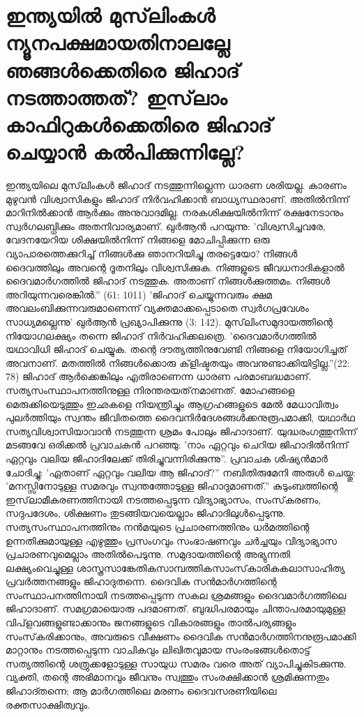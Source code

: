  \section{ ഇന്ത്യയില്‍ മുസ്‌ലിംകള്‍ ന്യൂനപക്ഷമായതിനാലല്ലേ ഞങ്ങള്‍ക്കെതിരെ ജിഹാദ് നടത്താത്തത്? ഇസ്‌ലാം കാഫിറുകള്‍ക്കെതിരെ ജിഹാദ് ചെയ്യാന്‍ കല്‍പിക്കുന്നില്ലേ?}
 ഇന്ത്യയിലെ മുസ്‌ലിംകള്‍ ജിഹാദ് നടത്തുന്നില്ലെന്ന ധാരണ ശരിയല്ല. കാരണം മുഴുവന്‍ വിശ്വാസികളും ജിഹാദ് നിര്‍വഹിക്കാന്‍ ബാധ്യസ്ഥരാണ്. അതില്‍നിന്ന് മാറിനില്‍ക്കാന്‍ ആര്‍ക്കും അനുവാദമില്ല. നരകശിക്ഷയില്‍നിന്ന് രക്ഷനേടാനും സ്വര്‍ഗലബ്ധിക്കും അതനിവാര്യമാണ്. ഖുര്‍ആന്‍ പറയുന്നു: 'വിശ്വസിച്ചവരേ, വേദനയേറിയ ശിക്ഷയില്‍നിന്ന് നിങ്ങളെ മോചിപ്പിക്കുന്ന ഒരു വ്യാപാരത്തെക്കുറിച്ച് നിങ്ങള്‍ക്കു ഞാനറിയിച്ചു തരട്ടെയോ? നിങ്ങള്‍ ദൈവത്തിലും അവന്റെ ദൂതനിലും വിശ്വസിക്കുക. നിങ്ങളുടെ ജീവധനാദികളാല്‍ ദൈവമാര്‍ഗത്തില്‍ ജിഹാദ് നടത്തുക. അതാണ് നിങ്ങള്‍ക്കുത്തമം. നിങ്ങള്‍ അറിയുന്നവരെങ്കില്‍.'' (61: 1011)
'ജിഹാദ് ചെയ്യുന്നവരും ക്ഷമ അവലംബിക്കുന്നവരുമാണെന്ന് വ്യക്തമാക്കപ്പെടാതെ സ്വര്‍ഗപ്രവേശം സാധ്യമല്ലെന്നു' ഖുര്‍ആന്‍ പ്രഖ്യാപിക്കുന്നു (3: 142). മുസ്‌ലിംസമുദായത്തിന്റെ നിയോഗലക്ഷ്യം തന്നെ ജിഹാദ് നിര്‍വഹിക്കലത്രെ. 'ദൈവമാര്‍ഗത്തില്‍ യഥാവിധി ജിഹാദ് ചെയ്യുക. തന്റെ ദൗത്യത്തിനുവേണ്ടി നിങ്ങളെ നിയോഗിച്ചത് അവനാണ്. മതത്തില്‍ നിങ്ങള്‍ക്കൊരു ക്‌ളിഷ്ടതയും അവനുണ്ടാക്കിയിട്ടില്ല.''(22: 78)
ജിഹാദ് ആര്‍ക്കെങ്കിലും എതിരാണെന്ന ധാരണ പരമാബദ്ധമാണ്. സത്യസംസ്ഥാപനത്തിനുള്ള നിരന്തരയത്‌നമാണത്. മോഹങ്ങളെ മെരുക്കിയെടുത്തും ഇഛകളെ നിയന്ത്രിച്ചും ആഗ്രഹങ്ങളുടെ മേല്‍ മേധാവിത്വം പുലര്‍ത്തിയും സ്വന്തം ജീവിതത്തെ ദൈവനിര്‍ദേശങ്ങള്‍ക്കനുരൂപമാക്കി, യഥാര്‍ഥ സത്യവിശ്വാസിയാവാന്‍ നടത്തുന്ന ശ്രമം പോലും ജിഹാദാണ്. യുദ്ധരംഗത്തുനിന്ന് മടങ്ങവേ ഒരിക്കല്‍ പ്രവാചകന്‍ പറഞ്ഞു: 'നാം ഏറ്റവും ചെറിയ ജിഹാദില്‍നിന്ന് ഏറ്റവും വലിയ ജിഹാദിലേക്ക് തിരിച്ചുവന്നിരിക്കുന്നു''. പ്രവാചക ശിഷ്യന്‍മാര്‍ ചോദിച്ചു: 'ഏതാണ് ഏറ്റവും വലിയ ആ ജിഹാദ്?'' നബിതിരുമേനി അരുള്‍ ചെയ്തു: 'മനസ്സിനോടുള്ള സമരവും സ്വന്തത്തോടുള്ള ജിഹാദുമാണത്.''
കുടുംബത്തിന്റെ ഇസ്‌ലാമീകരണത്തിനായി നടത്തപ്പെടുന്ന വിദ്യാഭ്യാസം, സംസ്‌കരണം, സദുപദേശം, ശിക്ഷണം തുടങ്ങിയവയെല്ലാം ജിഹാദിലുള്‍പ്പെടുന്നു. സത്യസംസ്ഥാപനത്തിനും നന്‍മയുടെ പ്രചാരണത്തിനും ധര്‍മത്തിന്റെ ഉന്നതിക്കുമായുള്ള എഴുത്തും പ്രസംഗവും സംഭാഷണവും ചര്‍ച്ചയും വിദ്യാഭ്യാസ പ്രചാരണവുമെല്ലാം അതില്‍പെടുന്നു. സമുദായത്തിന്റെ അഭ്യുന്നതി ലക്ഷ്യംവെച്ചുള്ള ശാസ്ത്രസാങ്കേതികസാമ്പത്തികസാംസ്‌കാരികകലാസാഹിത്യ പ്രവര്‍ത്തനങ്ങളും ജിഹാദുതന്നെ. ദൈവിക സന്‍മാര്‍ഗത്തിന്റെ സംസ്ഥാപനത്തിനായി നടത്തപ്പെടുന്ന സകല ശ്രമങ്ങളും ദൈവമാര്‍ഗത്തിലെ ജിഹാദാണ്. സമഗ്രമായൊരു പദമാണത്. ബുദ്ധിപരമായും ചിന്താപരമായുമുള്ള വിപ്‌ളവങ്ങളുണ്ടാക്കാനും ജനങ്ങളുടെ വികാരങ്ങളും താല്‍പര്യങ്ങളും സംസ്‌കരിക്കാനും, അവരുടെ വീക്ഷണം ദൈവിക സന്‍മാര്‍ഗത്തിനനുരൂപമാക്കി മാറ്റാനും നടത്തപ്പെടുന്ന വാചികവും ലിഖിതവുമായ സംരംഭങ്ങള്‍തൊട്ട് സത്യത്തിന്റെ ശത്രുക്കളോടുള്ള സായുധ സമരം വരെ അത് വ്യാപിച്ചുകിടക്കുന്നു. വ്യക്തി, തന്റെ അഭിമാനവും ജീവനും സ്വത്തും സംരക്ഷിക്കാന്‍ ശ്രമിക്കുന്നതും ജിഹാദ്തന്നെ; ആ മാര്‍ഗത്തിലെ മരണം ദൈവസരണിയിലെ രക്തസാക്ഷിത്വവും.
